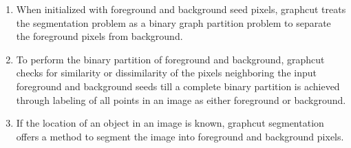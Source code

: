 \documentclass {udthesis}
\begin{document}
\begin{enumerate}
	\item When initialized with foreground and background seed pixels, graphcut treats the segmentation problem as a binary graph partition problem to separate the foreground pixels from background.
	
	\item To perform the binary partition of foreground and background, graphcut checks for similarity or dissimilarity of the pixels neighboring the input foreground and background seeds till a complete binary partition is achieved through labeling of all points in an image as either foreground or background.
	
	\item If the location of an object in an image is known, graphcut segmentation offers a method to segment the image into foreground and background pixels.
\end{enumerate}
\end{document}
